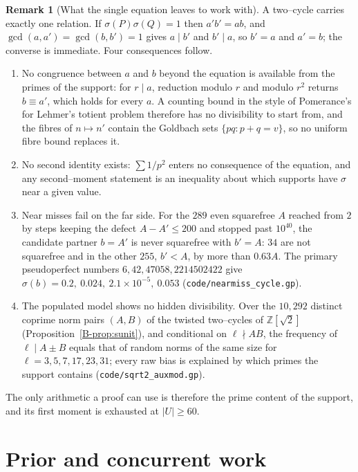 \documentclass[11pt]{article}
\theoremstyle{definition}
\newtheorem{remark}[theorem]{Remark}
\begin{document}
\begin{remark}[What the single equation leaves to work with]\label{rem:closedroutes}
A two--cycle carries exactly one relation. If $\sigma(P)\sigma(Q)=1$ then $a'b'=ab$, and
$\gcd(a,a')=\gcd(b,b')=1$ gives $a\mid b'$ and $b'\mid a$, so $b'=a$ and $a'=b$; the converse is
immediate. Four consequences follow.
\begin{enumerate}
\item No congruence between $a$ and $b$ beyond the equation is available from the primes of the support:
for $r\mid a$, reduction modulo $r$ and modulo $r^{2}$ returns $b\equiv a'$, which holds for every $a$.
A counting bound in the style of Pomerance's for Lehmer's totient problem therefore has no divisibility to
start from, and the fibres of $n\mapsto n'$ contain the Goldbach sets $\{pq:p+q=v\}$, so no uniform fibre
bound replaces it.
\item No second identity exists: $\sum1/p^{2}$ enters no consequence of the equation, and any
second--moment statement is an inequality about which supports have $\sigma$ near a given value.
\item Near misses fail on the far side. For the $289$ even squarefree $A$ reached from $2$ by steps
keeping the defect $A-A'\le200$ and stopped past $10^{40}$, the candidate partner $b=A'$ is never squarefree with $b'=A$: $34$
are not squarefree and in the other $255$, $b'<A$, by more than $0.63A$. The primary pseudoperfect numbers
$6,42,47058,2214502422$ give $\sigma(b)=0.2,\ 0.024,\ 2.1\times10^{-5},\ 0.053$
\textup{(\texttt{code/nearmiss\_cycle.gp})}.
\item The populated model shows no hidden divisibility. Over the $10{,}292$ distinct coprime norm pairs
$(A,B)$ of the twisted two--cycles of $\mathbb{Z}[\sqrt2]$ (Proposition~\ref{B-prop:sunit}), and conditional on
$\ell\nmid AB$, the frequency of $\ell\mid A\pm B$ equals that of random norms of the same size for
$\ell=3,5,7,17,23,31$; every raw bias is explained by which primes the support contains
\textup{(\texttt{code/sqrt2\_auxmod.gp})}.
\end{enumerate}
The only arithmetic a proof can use is therefore the prime content of the support, and its first moment
is exhausted at $|U|\ge60$.
\end{remark}

\section{Prior and concurrent work}\label{sec:prior}
\end{document}
